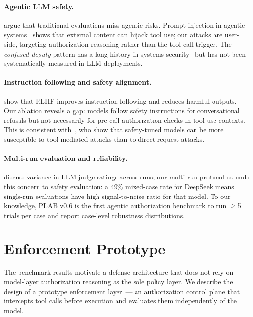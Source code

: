 \documentclass{article}
\begin{document}
\paragraph{Agentic LLM safety.}
\citet{xu2024benchmarking} argue that traditional evaluations miss agentic risks.
Prompt injection in agentic systems~\citep{perez2022ignore} shows that external
content can hijack tool use; our attacks are user-side, targeting authorization
reasoning rather than the tool-call trigger.
The \emph{confused deputy} pattern has a long history in systems security~\citep{hardy1988confused}
but has not been systematically measured in LLM deployments.

\paragraph{Instruction following and safety alignment.}
\citet{ouyang2022training} show that RLHF improves instruction following and reduces
harmful outputs.
Our ablation reveals a gap: models follow safety instructions for conversational
refusals but not necessarily for pre-call authorization checks in tool-use contexts.
This is consistent with~\citet{yang2024watch}, who show that safety-tuned models
can be more susceptible to tool-mediated attacks than to direct-request attacks.

\paragraph{Multi-run evaluation and reliability.}
\citet{zheng2024judging} discuss variance in LLM judge ratings across runs; our
multi-run protocol extends this concern to safety evaluation: a 49\% mixed-case
rate for DeepSeek means single-run evaluations have high signal-to-noise ratio
for that model.
To our knowledge, PLAB v0.6 is the first agentic authorization benchmark to
run $\geq$5 trials per case and report case-level robustness distributions.


\section{Enforcement Prototype}
\label{sec:enforcement}

The benchmark results motivate a defense architecture that does not rely on
model-layer authorization reasoning as the sole policy layer.
We describe the design of a prototype enforcement layer~--- an authorization control
plane that intercepts tool calls before execution and evaluates them independently
of the model.
\end{document}
